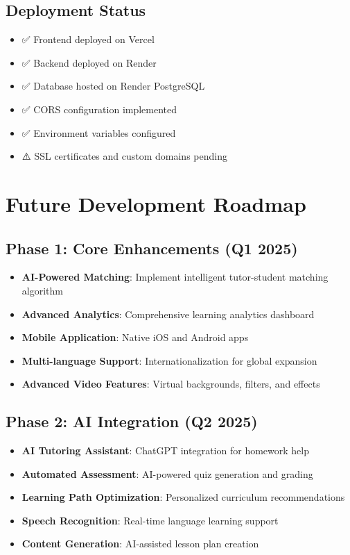 \documentclass[11pt,a4paper]{article}
\begin{document}
\subsection{Deployment Status}
\begin{itemize}
    \item ✅ Frontend deployed on Vercel
    \item ✅ Backend deployed on Render
    \item ✅ Database hosted on Render PostgreSQL
    \item ✅ CORS configuration implemented
    \item ✅ Environment variables configured
    \item ⚠️ SSL certificates and custom domains pending
\end{itemize}

\section{Future Development Roadmap}

\subsection{Phase 1: Core Enhancements (Q1 2025)}
\begin{itemize}
    \item \textbf{AI-Powered Matching}: Implement intelligent tutor-student matching algorithm
    \item \textbf{Advanced Analytics}: Comprehensive learning analytics dashboard
    \item \textbf{Mobile Application}: Native iOS and Android apps
    \item \textbf{Multi-language Support}: Internationalization for global expansion
    \item \textbf{Advanced Video Features}: Virtual backgrounds, filters, and effects
\end{itemize}

\subsection{Phase 2: AI Integration (Q2 2025)}
\begin{itemize}
    \item \textbf{AI Tutoring Assistant}: ChatGPT integration for homework help
    \item \textbf{Automated Assessment}: AI-powered quiz generation and grading
    \item \textbf{Learning Path Optimization}: Personalized curriculum recommendations
    \item \textbf{Speech Recognition}: Real-time language learning support
    \item \textbf{Content Generation}: AI-assisted lesson plan creation
\end{itemize}
\end{document}
